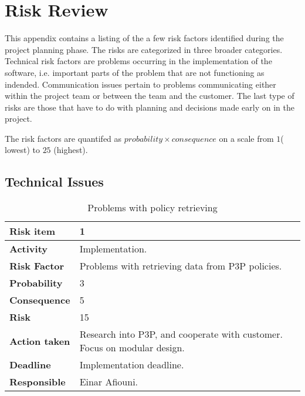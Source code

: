 \chapter{Risk Review}\label{riskAppendix}

\minitoc


This appendix contains a listing of the a few risk factors identified during the project planning phase. The risks are categorized in three broader categories. Technical risk factors are problems occurring in the implementation of the software, i.e. important parts of the problem that are not functioning as indended. Communication issues pertain to problems communicating either within the project team or between the team and the customer. The last type of risks are those that have to do with planning and decisions made early on in the project.

The risk factors are quantifed as $probability \times consequence$ on a scale from $1$( lowest) to $25$ (highest).


\section{Technical Issues}


\begin{table}[h!]

\begin{center}
\begin{tabularx}{\textwidth}{| X | X |}
\hline
\textbf{Risk item} & 1 \\
\hline
\textbf{Activity} & Implementation.  \\
\hline
\textbf{Risk Factor} & Problems with retrieving data from P3P policies. \\
\hline
\textbf{Probability} & 3 \\
\hline
\textbf{Consequence} & 5 \\
\hline
\textbf{Risk} & 15 \\
\hline
\textbf{Action taken} & Research into P3P, and cooperate with
customer. Focus on modular design. \\
\hline
\textbf{Deadline} & Implementation deadline. \\
\hline
\textbf{Responsible} & Einar Afiouni. \\
\hline
\end{tabularx}
\caption{Problems with policy retrieving}
\end{center}
\label{risk_3}
\end{table}

